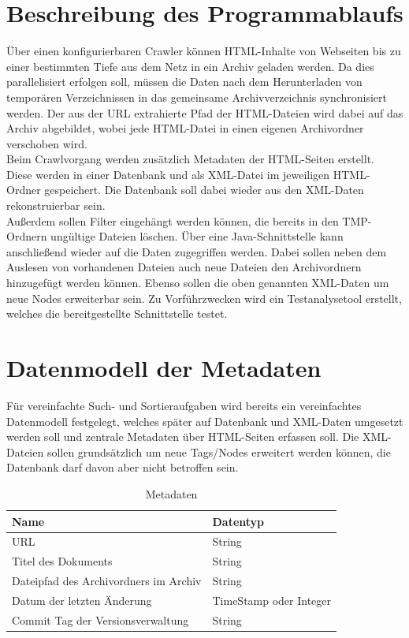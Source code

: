 \chapter{Beschreibung des Programmablaufs}
Über einen konfigurierbaren Crawler können HTML-Inhalte von Webseiten bis zu einer bestimmten Tiefe
aus dem Netz in ein Archiv geladen werden. Da dies parallelisiert erfolgen soll,
müssen die Daten nach dem Herunterladen von temporären Verzeichnissen in das gemeinsame
Archivverzeichnis synchronisiert werden. Der aus der URL extrahierte Pfad der HTML-Dateien wird
dabei auf das Archiv abgebildet, wobei jede HTML-Datei in einen eigenen Archivordner verschoben wird. \\
Beim Crawlvorgang werden zusätzlich Metadaten der HTML-Seiten erstellt. 
Diese werden in einer Datenbank und als XML-Datei im jeweiligen HTML-Ordner gespeichert.
Die Datenbank soll dabei wieder aus den XML-Daten rekonstruierbar sein. \\
Außerdem sollen Filter eingehängt werden können, die bereits in den TMP-Ordnern ungültige Dateien löschen.
Über eine Java-Schnittstelle kann anschließend wieder auf die Daten zugegriffen werden.
Dabei sollen neben dem Auslesen von vorhandenen Dateien auch neue Dateien den Archivordnern hinzugefügt werden können.
Ebenso sollen die oben genannten XML-Daten um neue Nodes erweiterbar sein.
Zu Vorführzwecken wird ein Testanalysetool erstellt, welches die bereitgestellte Schnittstelle testet.

\chapter{Datenmodell der Metadaten}
Für vereinfachte Such- und Sortieraufgaben wird bereits ein vereinfachtes Datenmodell festgelegt, welches
später auf Datenbank und XML-Daten umgesetzt werden soll und zentrale Metadaten über HTML-Seiten erfassen soll.
Die XML-Dateien sollen grundsätzlich um neue Tags/Nodes erweitert werden können, die Datenbank darf davon aber nicht betroffen sein.
\begin{table}[h]
\centering
\begin{tabular}{|l|l|}	
	\hline
	Name & Datentyp \\
	\hline
	URL & String \\
	Titel des Dokuments & String \\ %
	Dateipfad des Archivordners im Archiv & String \\
	Datum der letzten Änderung & TimeStamp oder Integer \\
	Commit Tag der Versionsverwaltung & String \\
	\hline
\end{tabular}
\caption{Metadaten}
\end{table}

